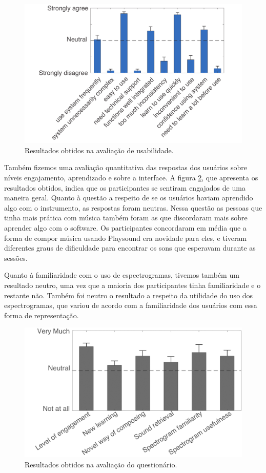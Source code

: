 \begin{figure}

\includegraphics[width=1\textwidth]{pictures/cap4/SUS_lower}
\caption{Resultados obtidos na avaliação de usabilidade.}
\label{fig:SUS}
\end{figure}

Também fizemos uma avaliação quantitativa das respostas dos usuários sobre níveis engajamento, aprendizado e sobre a interface. A figura \ref{fig:questionnaire}, que apresenta os resultados obtidos, indica que os participantes se sentiram engajados de uma maneira geral. Quanto à questão a respeito de se os usuários haviam aprendido algo com o instrumento, as respostas foram neutras. Nessa questão as pessoas que tinha mais prática com música também foram as que discordaram mais sobre aprender algo com o software. Os participantes concordaram em média que a forma de compor música usando Playsound era novidade para eles, e tiveram diferentes graus de dificuldade para encontrar os sons que esperavam durante as sessões. 

Quanto à familiaridade com o uso de espectrogramas, tivemos também um resultado neutro, uma vez que a maioria dos participantes tinha familiaridade e o restante não. Também foi neutro o resultado a respeito da utilidade do uso dos espectrogramas, que variou de acordo com a familiaridade dos usuários com essa forma de representação.


\begin{figure}

\includegraphics[width=1\textwidth]{pictures/cap4/questionnaire_lower}
\caption{Resultados obtidos na avaliação do questionário.}
\label{fig:questionnaire}
\end{figure}

